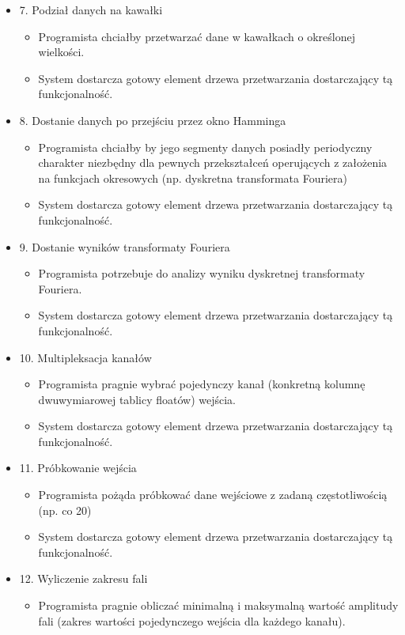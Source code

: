 \begin{itemize}
	\item 7. Podział danych na kawałki
	\begin{itemize}
		\item Programista chciałby przetwarzać dane w kawałkach o określonej wielkości.
		\item System dostarcza gotowy element drzewa przetwarzania dostarczający tą funkcjonalność.
	\end{itemize}
	\item 8. Dostanie danych po przejściu przez okno Hamminga
	\begin{itemize}
		\item Programista chciałby by jego segmenty danych posiadły periodyczny charakter niezbędny dla pewnych przekształceń operujących z założenia na funkcjach okresowych (np. dyskretna transformata Fouriera)
		\item System dostarcza gotowy element drzewa przetwarzania dostarczający tą funkcjonalność.
	\end{itemize}
	\item 9. Dostanie wyników transformaty Fouriera
	\begin{itemize}
		\item Programista potrzebuje do analizy wyniku dyskretnej transformaty Fouriera.
		\item System dostarcza gotowy element drzewa przetwarzania dostarczający tą funkcjonalność.
	\end{itemize}
	\item 10. Multipleksacja kanałów
	\begin{itemize}
		\item Programista pragnie wybrać pojedynczy kanał (konkretną kolumnę dwuwymiarowej tablicy floatów) wejścia.
		\item System dostarcza gotowy element drzewa przetwarzania dostarczający tą funkcjonalność.
	\end{itemize}
	\item 11. Próbkowanie wejścia
	\begin{itemize}
		\item Programista pożąda próbkować dane wejściowe z zadaną częstotliwością (np. co 20)
		\item System dostarcza gotowy element drzewa przetwarzania dostarczający tą funkcjonalność.
	\end{itemize}
	\item 12. Wyliczenie zakresu fali
	\begin{itemize}
		\item Programista pragnie obliczać minimalną i maksymalną wartość amplitudy fali (zakres wartości pojedynczego wejścia dla każdego kanału).

\end{itemize}
\end{itemize}
